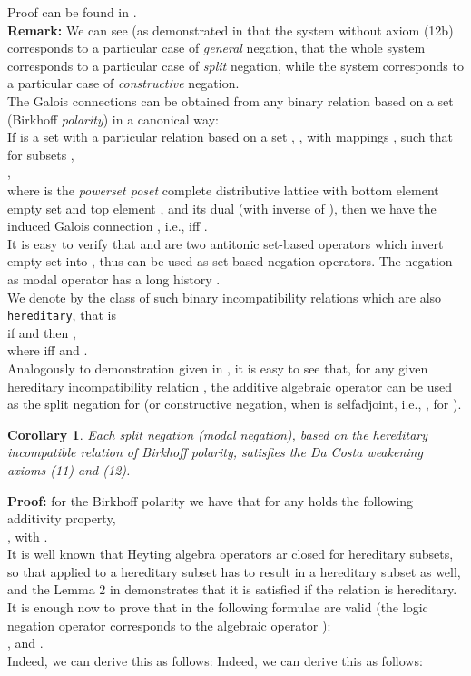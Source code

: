 \documentclass{llncs}
\newtheorem{coro}{Corollary}
\begin{document}
Proof can be found in \cite{Majk06ml}.\\
\textbf{Remark:} We can see (as demonstrated in \cite{Majk08dc} that
the system  without axiom (12b) corresponds to a particular
case of \emph{general} negation, that the whole system 
corresponds to a particular case of \emph{split} negation, while the
system  corresponds to a
particular case of \emph{constructive} negation.\\
The Galois connections can be obtained from  any binary relation
based on a set  \cite{Birkh40} (Birkhoff \emph{polarity})
in a canonical way:\\
If  is a set with a particular relation based on a set
, ,  with mappings
, such that for subsets , \\
,\\
where  is the  \emph{powerset poset} complete
distributive lattice with bottom element empty set  and
top element , and  its dual (with  
inverse of ), then we have the induced Galois connection
, i.e.,  iff
.\\
It is easy to verify that  and  are two antitonic
set-based operators which invert empty set  into ,
thus can be used as set-based negation operators. The negation as
modal operator has a long history \cite{Dose86}.\\
We denote by  the class of such binary
incompatibility
relations  which are also \verb"hereditary", that is\\
  if  and  then ,\\
where  iff  and .\\
 Analogously to demonstration given in \cite{Majk08dc}, it is easy to see that, for any given  hereditary incompatibility
relation ,  the additive algebraic operator  can be
used as the split negation for  (or constructive negation,
when  is selfadjoint, i.e., , for ).
\begin{coro} Each split negation (modal negation), based on the hereditary incompatible
relation of Birkhoff polarity, satisfies the Da Costa weakening
axioms (11) and (12).
\end{coro}
\textbf{Proof:} for the Birkhoff polarity we have that
 for any  holds the following additivity property,\\
  , with .\\
 It is well known that Heyting algebra operators ar closed for
 hereditary subsets, so that  applied to a hereditary
 subset  has to result in a hereditary subset  as
 well, and the Lemma 2 in \cite{Majk08dc} demonstrates that it is satisfied if the
 relation  is hereditary.\\
  It is enough now to prove that in  the following formulae are valid (the logic negation operator 
  corresponds to the algebraic operator ):\\
 , and .\\
 Indeed, we can derive this as follows:
Indeed, we can derive this as follows:
\end{document}
